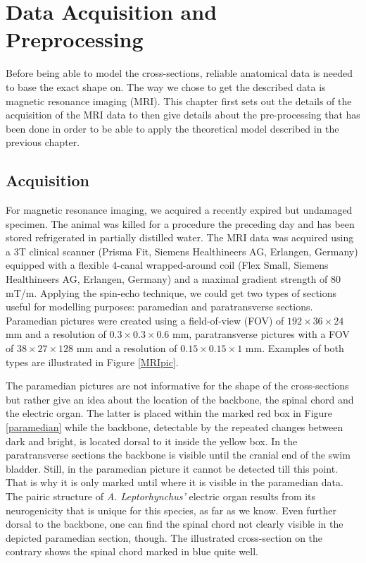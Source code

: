 \chapter{Data Acquisition and Preprocessing}
    \label{MRIdata}
Before being able to model the cross-sections, reliable anatomical data is needed to base the exact shape on. The way we chose to get the described data is magnetic resonance imaging (MRI). This chapter first sets out the details of the acquisition of the MRI data to then give details about the pre-processing that has been done in order to be able to apply the theoretical model described in the previous chapter.


\section{Acquisition}
    \label{MRI}

For magnetic resonance imaging, we acquired a recently expired but undamaged specimen. The animal was killed for a procedure the preceding day and has been stored refrigerated in partially distilled water. The MRI data was acquired using a 3T clinical scanner (Prisma Fit, Siemens Healthineers AG, Erlangen, Germany) equipped with a flexible 4-canal wrapped-around coil (Flex Small, Siemens Healthineers AG, Erlangen, Germany) and a maximal gradient strength of 80 mT/m. Applying the spin-echo technique, we could get two types of sections useful for modelling purposes: paramedian and paratransverse sections. Paramedian pictures were created using a field-of-view (FOV) of $192 \times 36 \times 24$ mm and a resolution of $0.3 \times 0.3 \times 0.6$ mm, paratransverse pictures with a FOV of $38 \times 27 \times 128$ mm and a resolution of $0.15 \times 0.15 \times 1$ mm. Examples of both types are illustrated in Figure \ref{MRIpic}.

The paramedian pictures are not informative for the shape of the cross-sections but rather give an idea about the location of the backbone, the spinal chord and the electric organ. The latter is placed within the marked red box in Figure \ref{paramedian} while the backbone, detectable by the repeated changes between dark and bright, is located dorsal to it inside the yellow box. In the paratransverse sections the backbone is visible until the cranial end of the swim bladder. Still, in the paramedian picture it cannot be detected till this point. That is why it is only marked until where it is visible in the paramedian data. The pairic structure of \textit{A. Leptorhynchus'} electric organ results from its neurogenicity \cite{bennett1971electric} that is unique for this species, as far as we know. Even further dorsal to the backbone, one can find the spinal chord not clearly visible in the depicted paramedian section, though. The illustrated cross-section on the contrary shows the spinal chord marked in blue quite well. 

